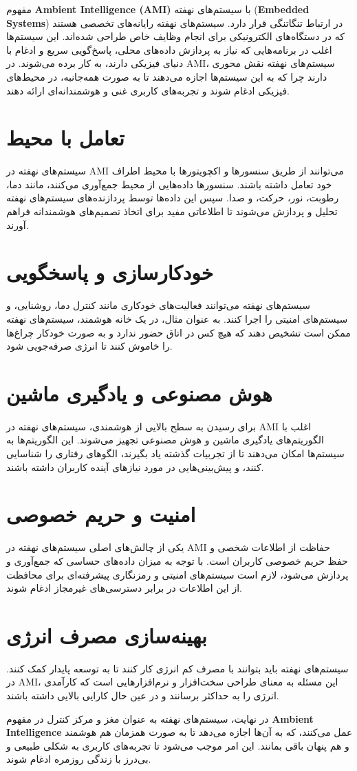 مفهوم \textbf{Ambient Intelligence (AMI)} با سیستم‌های نهفته (\textbf{Embedded Systems}) در ارتباط تنگاتنگی قرار دارد. سیستم‌های نهفته رایانه‌های تخصصی هستند که در دستگاه‌های الکترونیکی برای انجام وظایف خاص طراحی شده‌اند. این سیستم‌ها اغلب در برنامه‌هایی که نیاز به پردازش داده‌های محلی، پاسخ‌گویی سریع و ادغام با دنیای فیزیکی دارند، به کار برده می‌شوند. در AMI، سیستم‌های نهفته نقش محوری دارند چرا که به این سیستم‌ها اجازه می‌دهند تا به صورت همه‌جانبه، در محیط‌های فیزیکی ادغام شوند و تجربه‌های کاربری غنی و هوشمندانه‌ای ارائه دهند.

\section*{تعامل با محیط}
سیستم‌های نهفته در AMI می‌توانند از طریق سنسورها و اکچویتورها با محیط اطراف خود تعامل داشته باشند. سنسورها داده‌هایی از محیط جمع‌آوری می‌کنند، مانند دما، رطوبت، نور، حرکت، و صدا. سپس این داده‌ها توسط پردازنده‌های سیستم‌های نهفته تحلیل و پردازش می‌شوند تا اطلاعاتی مفید برای اتخاذ تصمیم‌های هوشمندانه فراهم آورند.

\section*{خودکارسازی و پاسخگویی}
سیستم‌های نهفته می‌توانند فعالیت‌های خودکاری مانند کنترل دما، روشنایی، و سیستم‌های امنیتی را اجرا کنند. به عنوان مثال، در یک خانه هوشمند، سیستم‌های نهفته ممکن است تشخیص دهند که هیچ کس در اتاق حضور ندارد و به صورت خودکار چراغ‌ها را خاموش کنند تا انرژی صرفه‌جویی شود.

\section*{هوش مصنوعی و یادگیری ماشین}
برای رسیدن به سطح بالایی از هوشمندی، سیستم‌های نهفته در AMI اغلب با الگوریتم‌های یادگیری ماشین و هوش مصنوعی تجهیز می‌شوند. این الگوریتم‌ها به سیستم‌ها امکان می‌دهند تا از تجربیات گذشته یاد بگیرند، الگوهای رفتاری را شناسایی کنند، و پیش‌بینی‌هایی در مورد نیازهای آینده کاربران داشته باشند.

\section*{امنیت و حریم خصوصی}
یکی از چالش‌های اصلی سیستم‌های نهفته در AMI حفاظت از اطلاعات شخصی و حفظ حریم خصوصی کاربران است. با توجه به میزان داده‌های حساسی که جمع‌آوری و پردازش می‌شود، لازم است سیستم‌های امنیتی و رمزنگاری پیشرفته‌ای برای محافظت از این اطلاعات در برابر دسترسی‌های غیرمجاز ادغام شوند.

\section*{بهینه‌سازی مصرف انرژی}
سیستم‌های نهفته باید بتوانند با مصرف کم انرژی کار کنند تا به توسعه پایدار کمک کنند. در AMI، این مسئله به معنای طراحی سخت‌افزار و نرم‌افزارهایی است که کارآمدی انرژی را به حداکثر برسانند و در عین حال کارایی بالایی داشته باشند.

در نهایت، سیستم‌های نهفته به عنوان مغز و مرکز کنترل در مفهوم \textbf{Ambient Intelligence} عمل می‌کنند، که به آن‌ها اجازه می‌دهد تا به صورت همزمان هم هوشمند و هم پنهان باقی بمانند. این امر موجب می‌شود تا تجربه‌های کاربری به شکلی طبیعی و بی‌درز با زندگی روزمره ادغام شوند.
